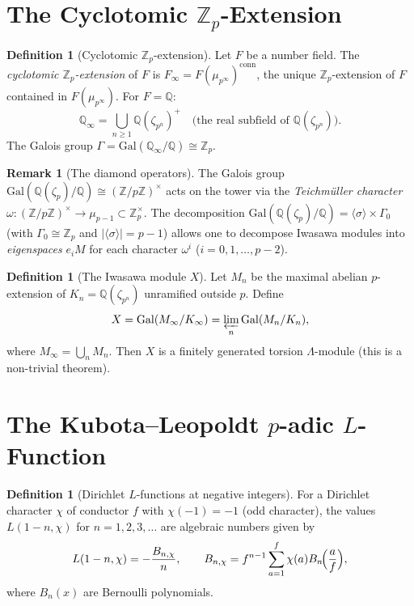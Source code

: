 \documentclass[12pt,a4paper]{amsart}
\theoremstyle{definition}
\newtheorem{definition}[theorem]{Definition}
\newtheorem{remark}[theorem]{Remark}
\newcommand{\Z}{\mathbb{Z}}
\newcommand{\Q}{\mathbb{Q}}
\newcommand{\Zp}{\mathbb{Z}_p}
\newcommand{\Gal}{\mathrm{Gal}}
\begin{document}
\section{The Cyclotomic $\Zp$-Extension}

\begin{definition}[Cyclotomic $\Zp$-extension]
\label{def:cyclotomic_ext}
Let $F$ be a number field.  The \emph{cyclotomic $\Zp$-extension} of $F$
is $F_\infty = F(\mu_{p^\infty})^{\mathrm{conn}}$, the unique $\Zp$-extension
of $F$ contained in $F(\mu_{p^\infty})$.  For $F = \Q$:
\[
  \Q_\infty = \bigcup_{n \ge 1} \Q(\zeta_{p^n})^+
  \quad\text{(the real subfield of $\Q(\zeta_{p^n})$)}.
\]
The Galois group $\Gamma = \Gal(\Q_\infty/\Q) \cong \Zp$.
\end{definition}

\begin{remark}[The diamond operators]
The Galois group $\Gal(\Q(\zeta_p)/\Q) \cong (\Z/p\Z)^\times$ acts on
the tower via the \emph{Teichmüller character}
$\omega : (\Z/p\Z)^\times \to \mu_{p-1} \subset \Zp^\times$.
The decomposition $\Gal(\Q(\zeta_p)/\Q) = \langle\sigma\rangle \times \Gamma_0$
(with $\Gamma_0 \cong \Zp$ and $|\langle\sigma\rangle| = p-1$) allows one to
decompose Iwasawa modules into \emph{eigenspaces} $e_i M$ for each character
$\omega^i$ ($i = 0, 1, \ldots, p-2$).
\end{remark}

\begin{definition}[The Iwasawa module $X$]
Let $M_n$ be the maximal abelian $p$-extension of $K_n = \Q(\zeta_{p^n})$
unramified outside $p$.  Define
\[
  X = \Gal(M_\infty / K_\infty)
  = \varprojlim_n \Gal(M_n/K_n),
\]
where $M_\infty = \bigcup_n M_n$.  Then $X$ is a finitely generated
torsion $\Lambda$-module (this is a non-trivial theorem).
\end{definition}

\section{The Kubota--Leopoldt $p$-adic $L$-Function}

\begin{definition}[Dirichlet $L$-functions at negative integers]
For a Dirichlet character $\chi$ of conductor $f$ with $\chi(-1) = -1$
(odd character), the values $L(1-n, \chi)$ for $n = 1, 2, 3, \ldots$ are
algebraic numbers given by
\[
  L(1-n, \chi) = -\frac{B_{n,\chi}}{n},
  \qquad
  B_{n,\chi} = f^{n-1} \sum_{a=1}^{f} \chi(a) B_n\!\Bigl(\frac{a}{f}\Bigr),
\]
where $B_n(x)$ are Bernoulli polynomials.
\end{definition}
\end{document}

